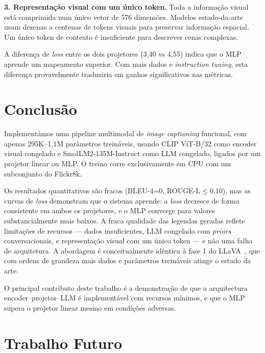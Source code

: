 \documentclass[conference]{IEEEtran}
\begin{document}
\textbf{3. Representação visual com um único token.} Toda a informação visual está comprimida num único vetor de 576 dimensões. Modelos estado-da-arte usam dezenas a centenas de tokens visuais para preservar informação espacial. Um único token de contexto é insuficiente para descrever cenas complexas.

A diferença de \textit{loss} entre os dois projetores (3,40 vs 4,55) indica que o MLP aprende um mapeamento superior. Com mais dados e \textit{instruction tuning}, esta diferença provavelmente traduziria em ganhos significativos nas métricas.


\section{Conclusão}

Implementámos uma pipeline multimodal de \textit{image captioning} funcional, com apenas 295K--1,1M parâmetros treináveis, usando CLIP ViT-B/32 como encoder visual congelado e SmolLM2-135M-Instruct como LLM congelado, ligados por um projetor linear ou MLP. O treino corre exclusivamente em CPU com um subconjunto do Flickr8k.

Os resultados quantitativos são fracos (BLEU-4=0, ROUGE-L$\leq$0,10), mas as curvas de \textit{loss} demonstram que o sistema aprende: a \textit{loss} decresce de forma consistente em ambos os projetores, e o MLP converge para valores substancialmente mais baixos. A fraca qualidade das legendas geradas reflete limitações de recursos --- dados insuficientes, LLM congelado com \textit{priors} conversacionais, e representação visual com um único token --- e não uma falha de arquitetura. A abordagem é conceitualmente idêntica à fase 1 do LLaVA~\cite{b1}, que com ordens de grandeza mais dados e parâmetros treináveis atinge o estado da arte.

O principal contributo deste trabalho é a demonstração de que a arquitectura encoder--projetor--LLM é implementável com recursos mínimos, e que o MLP supera o projetor linear mesmo em condições adversas.


\section{Trabalho Futuro}
\end{document}
